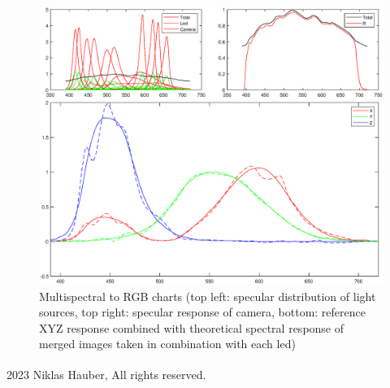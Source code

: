 \documentclass[11pt, twoside, listof=totocnumbered, bibliography=totocnumbered]{scrartcl}
\begin{document}
\begin{figure}[h!]
	\begin{center} 
		\includegraphics[width=1\linewidth]{chart.eps}
		\caption{Multispectral to RGB charts (top left: specular distribution of light sources, top right: specular response of camera, bottom: reference XYZ response combined with theoretical spectral response of merged images taken in combination with each led)} 
		\label{multispectral_to_rgb}
	\end{center} 
\end{figure} 
\newpage

\vspace*{\fill}
\textsuperscript{\textcopyright} 2023 Niklas Hauber, All rights reserved.
\end{document}
